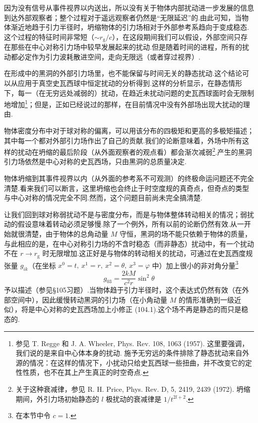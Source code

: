 因为没有信号从事件视界以内送出，所以没有关于物体内部扰动进一步发展的信息到达外部观察者；整个过程对于遥远观察者仍然是“无限延迟”的.由此可知，当物体渐近地趋于引力半径时，坍缩物体的引力场相对于外部参考系趋向于变成稳态.这个过程的特征时间非常短（$\sim r_{\mathrm{g}}/c$），在这段期间我们可以假设，外部空间只存在那些在中心对称引力场中较早发展起来的扰动.但是随着时间的进程，所有的扰动都必定作为引力波耗散进空间，走向无限远（或者穿过视界）.

在形成中的黑洞的外部引力场里，也不能保留与时间无关的静态扰动.这个结论可以从应用于真空史瓦西球中恒定扰动的分析得到.这样的分析显示，在静态情形下，每一（在无穷远处减弱的）扰动，在趋近未扰动问题的史瓦西球面时会无限制地增加\footnote{参见 T. Regge 和 J. A. Wheeler, Phys. Rev. 108, 1063 (1957). 这里要强调，我们说的是来自中心体本身的扰动. 施予无穷远的条件排除了静态扰动来自外源的情况：在这样的情况下，小扰动只给史瓦西球一些扭曲，并不改变它的定性性质，也不在其上产生真正的时空奇点.}；但是，正如已经说过的那样，在目前情况中没有外部场出现大扰动的理由.

物体密度分布中对于球对称的偏离，可以用该分布的四极矩和更高的多极矩描述；其中每一个都对外部引力场作出了自己的贡献.我们的论断意味着，外场中所有这样的扰动在坍缩的最后阶段（从外面观察者的观点看）都会渐次减弱\footnote{关于这种衰减律，参见 R. H. Price, Phys. Rev. D, 5, 2419, 2439 (1972). 坍缩期间，外引力场初始静态的 $l$ 极扰动的衰减律是 $1/t^{2l+2}$.}.产生的黑洞引力场依然是中心对称的史瓦西场，只由黑洞的总质量决定.

物体坍缩到其事件视界以内（从外面的参考系不可观测）的终极命运问题还不完全清楚.看来我们可以断言，这里坍缩也会终止于时空度规的真奇点，但奇点的类型与中心对称的情况完全不同.然而，这个问题目前尚未完全搞清楚.

让我们回到球对称弱扰动不是与密度分布，而是与物体整体转动相关的情况；弱扰动的假设意味着转动必须足够慢.除了一个例外，所有以前的论断仍然有效.从一开始就很清楚，由于物体的总角动量 $M$ 守恒，黑洞的场不能只依赖于物体的质量，与此相应的是，在中心对称引力场的不含时稳态（而非静态）扰动中，有一个扰动不在 $r\to r_{\mathrm{g}}$ 时无限增加.这正好是与物体的转动相关的扰动，可通过在史瓦西度规张量 $g_{ik}$（在坐标 $x^0=t,\ x^1=r,\ x^2=\theta,\ x^3=\varphi$ 中）加上很小的非对角分量\footnote{在本节中令 $c=1$.}
\begin{equation}
  g_{03}=\frac{2kM}{c^{2}r}\sin^{2}\theta
\end{equation}
予以描述（参见§105习题）.当物体趋于引力半径时，这个表达式仍然有效（在外部空间中），因此缓慢转动黑洞的引力场（在小角动量 $M$ 的情形准确到一级近似），将是中心对称的史瓦西场加上小修正 (104.1).这个场不再是静态的而只是稳态的.

